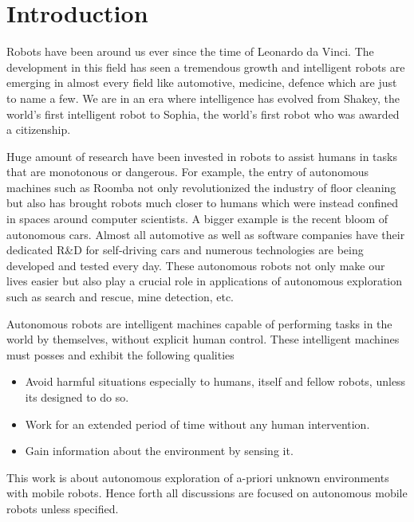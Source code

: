 \chapter{Introduction}
Robots have been around us ever since the time of Leonardo da Vinci. The development in this field has seen a tremendous growth and intelligent robots are emerging in almost every field like automotive, medicine, defence which are just to name a few. We are in an era where intelligence has evolved from Shakey, the world's first intelligent robot to Sophia, the world's first robot who was awarded a citizenship.

\par Huge amount of research have been invested in robots to assist humans in tasks that are monotonous or dangerous. For example, the entry of autonomous machines such as Roomba\cite{1} not only revolutionized the industry of floor cleaning but also has brought robots much closer to humans which were instead confined in spaces around computer scientists. A bigger example is the recent bloom of autonomous cars. Almost all automotive as well as software companies have their dedicated R\&D for self-driving cars and numerous technologies are being developed and tested every day. These autonomous robots not only make our lives easier but also play a crucial role in applications of autonomous exploration such as search and rescue, mine detection, etc. 

\par Autonomous robots are intelligent machines capable of performing tasks in the world by themselves, without explicit human control. These intelligent machines must posses and exhibit the following qualities\cite{6}
\begin{itemize}
    \item Avoid harmful situations especially to humans, itself and fellow robots, unless its designed to do so. 
    \item Work for an extended period of time without any human intervention.
    \item Gain information about the environment by sensing it.
\end{itemize}
This work is about autonomous exploration of a-priori unknown environments with mobile robots. Hence forth all discussions are focused on autonomous mobile robots unless specified.

